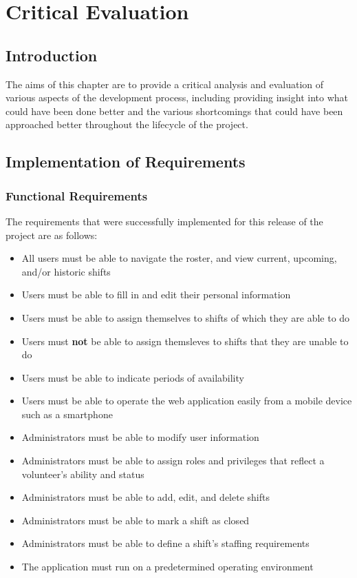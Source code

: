 \chapter{Critical Evaluation}

\section{Introduction}
The aims of this chapter are to provide a critical analysis and evaluation of various aspects of the development process, including providing insight into what could have been done better and the various shortcomings that could have been approached better throughout the lifecycle of the project. 

\section{Implementation of Requirements}

\subsection{Functional Requirements}
The requirements that were successfully implemented for this release of the project are as follows:

\begin{itemize}
    \item All users must be able to navigate the roster, and view current, upcoming, and/or historic shifts
    \item Users must be able to fill in and edit their personal information
    \item Users must be able to assign themselves to shifts of which they are able to do
    \item Users must \textbf{not} be able to assign themsleves to shifts that they are unable to do
    \item Users must be able to indicate periods of availability
    \item Users must be able to operate the web application easily from a mobile device such as a smartphone
    \item Administrators must be able to modify user information
    \item Administrators must be able to assign roles and privileges that reflect a volunteer's ability and status
    \item Administrators must be able to add, edit, and delete shifts
    \item Administrators must be able to mark a shift as closed
    \item Administrators must be able to define a shift's staffing requirements
    \item The application must run on a predetermined operating environment
\end{itemize}

